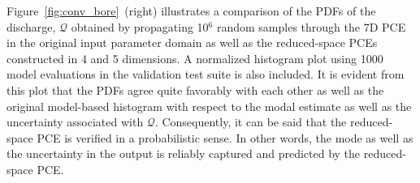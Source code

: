 Figure~\ref{fig:conv_bore}~(right) illustrates a comparison of the PDFs
of the
discharge, $\mathcal{Q}$ obtained by propagating 10$^6$ random
samples through the 7D PCE in the original input parameter domain as well as
the reduced-space PCEs constructed in 4 and 5 dimensions. A normalized histogram
plot using 1000 model evaluations in the validation test suite is also included.
It is evident from this plot that the PDFs agree quite favorably with each
other as well as the original model-based histogram with respect to the modal estimate
as well as the uncertainty associated with $\mathcal{Q}$. 
Consequently, it can be said that the reduced-space PCE is verified in a
probabilistic sense. In other words, the mode as well as the uncertainty in the
output is reliably captured and predicted by the reduced-space PCE. 
% 
%
